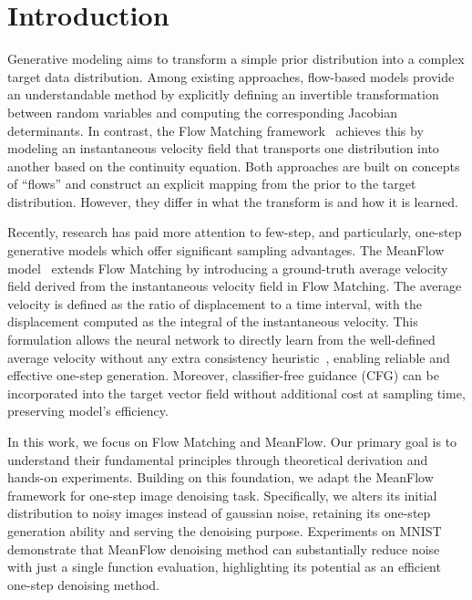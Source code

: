 \section{Introduction}

Generative modeling aims to transform a simple prior distribution into a complex target data distribution. Among existing approaches, flow-based models provide an understandable method by explicitly defining an invertible transformation between random variables and computing the corresponding Jacobian determinants. In contrast, the Flow Matching framework~\cite{flowmatching} achieves this by modeling an instantaneous velocity field that transports one distribution into another based on the continuity equation. Both approaches are built on concepts of ``flows'' and construct an explicit mapping from the prior to the target distribution. However, they differ in what the transform is and how it is learned.

Recently, research has paid more attention to few-step, and particularly, one-step generative models which offer significant sampling advantages. The MeanFlow model~\cite{meanflow} extends Flow Matching by introducing a ground-truth average velocity field derived from the instantaneous velocity field in Flow Matching. The average velocity is defined as the ratio of displacement to a time interval, with the displacement computed as the integral of the instantaneous velocity. This formulation allows the neural network to directly learn from the well-defined average velocity without any extra consistency heuristic~\cite{meanflow}, enabling reliable and effective one-step generation. Moreover, classifier-free guidance (CFG) can be incorporated into the target vector field without additional cost at sampling time, preserving model's efficiency.

In this work, we focus on Flow Matching and MeanFlow. Our primary goal is to understand their fundamental principles through theoretical derivation and hands-on experiments. Building on this foundation, we adapt the MeanFlow framework for one-step image denoising task. Specifically, we alters its initial distribution to noisy images instead of gaussian noise, retaining its one-step generation ability and serving the denoising purpose. Experiments on MNIST demonstrate that MeanFlow denoising method can substantially reduce noise with just a single function evaluation, highlighting its potential as an efficient one-step denoising method.
